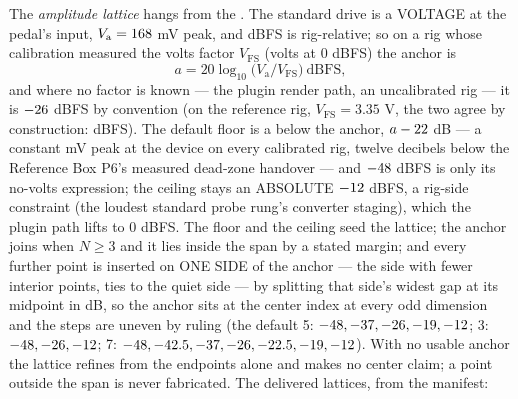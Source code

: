 \documentclass[11pt,a4paper]{article}
\begin{document}
The \emph{amplitude lattice} hangs from the . The
standard drive is a VOLTAGE at the pedal's input,
$V_{\mathrm{a}} = 168$ mV peak, and dBFS is rig-relative;
so on a rig whose calibration measured the volts factor $V_{\mathrm{FS}}$
(volts at 0 dBFS) the anchor is
\begin{equation}
  a = 20\log_{10}\!\big(V_{\mathrm{a}} / V_{\mathrm{FS}}\big)\ \mathrm{dBFS},
  \label{eq:anchor}
\end{equation}
and where no factor is known --- the plugin render path, an uncalibrated
rig --- it is $-26$ dBFS by convention (on the reference
rig, $V_{\mathrm{FS}} = 3.35$ V, the two agree by construction:
\mlatReferenceAnchor{} dBFS). The default floor is a 
below the anchor, $a - 22$ dB --- a constant
\mlatFloorMillivolts{} mV peak at the device on every calibrated rig,
twelve decibels below the Reference Box P6's measured dead-zone handover
--- and $-48$ dBFS is only its no-volts expression; the
ceiling stays an ABSOLUTE $-12$ dBFS, a rig-side constraint (the
loudest standard probe rung's converter staging), which the plugin path
lifts to 0 dBFS. The floor and the ceiling seed the lattice; the anchor
joins when $N \ge 3$ and it lies inside the span by a stated margin; and
every further point is inserted on ONE SIDE of the anchor --- the side
with fewer interior points, ties to the quiet side --- by splitting that
side's widest gap at its midpoint in dB, so the anchor sits at the center
index at every odd dimension and the steps are uneven by ruling (the
default 5: $-48, -37, -26, -19, -12$; 3: $-48, -26, -12$; 7:
$-48, -42.5, -37, -26, -22.5, -19, -12$). With no usable anchor the lattice refines from the
endpoints alone and makes no center claim; a point outside the span is
never fabricated. The delivered lattices, from the manifest:
\begin{center}\scriptsize\setlength{\tabcolsep}{4pt}\mlatAmplitudeTable\end{center}
\end{document}
